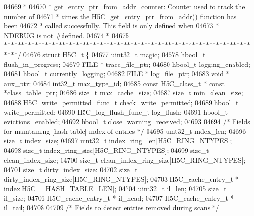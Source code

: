 \begin{DoxyCode}
04669 \textcolor{comment}{ *}
04670 \textcolor{comment}{ * get\_entry\_ptr\_from\_addr\_counter: Counter used to track the number of}
04671 \textcolor{comment}{ *              times the H5C\_get\_entry\_ptr\_from\_addr() function has been}
04672 \textcolor{comment}{ *              called successfully.  This field is only defined when}
04673 \textcolor{comment}{ *              NDEBUG is not #defined.}
04674 \textcolor{comment}{ *}
04675 \textcolor{comment}{ ****************************************************************************/}
04676 \textcolor{keyword}{struct }\hyperlink{struct_h5_c__t}{H5C\_t} \{
04677     uint32\_t            magic;
04678     hbool\_t         flush\_in\_progress;
04679     FILE *          trace\_file\_ptr;
04680     hbool\_t                     logging\_enabled;
04681     hbool\_t                     currently\_logging;
04682     FILE *          log\_file\_ptr;
04683     \textcolor{keywordtype}{void} *          aux\_ptr;
04684     int32\_t         max\_type\_id;
04685     \textcolor{keyword}{const} H5C\_class\_t * \textcolor{keyword}{const}   *class\_table\_ptr;
04686     \textcolor{keywordtype}{size\_t}                      max\_cache\_size;
04687     \textcolor{keywordtype}{size\_t}                      min\_clean\_size;
04688     H5C\_write\_permitted\_func\_t  check\_write\_permitted;
04689     hbool\_t         write\_permitted;
04690     H5C\_log\_flush\_func\_t    log\_flush;
04691     hbool\_t         evictions\_enabled;
04692     hbool\_t         close\_warning\_received;
04693 
04694     \textcolor{comment}{/* Fields for maintaining [hash table] index of entries */}
04695     uint32\_t                    index\_len;
04696     \textcolor{keywordtype}{size\_t}                      index\_size;
04697     uint32\_t            index\_ring\_len[H5C\_RING\_NTYPES];
04698     \textcolor{keywordtype}{size\_t}          index\_ring\_size[H5C\_RING\_NTYPES];
04699     \textcolor{keywordtype}{size\_t}          clean\_index\_size;
04700     \textcolor{keywordtype}{size\_t}          clean\_index\_ring\_size[H5C\_RING\_NTYPES];
04701     \textcolor{keywordtype}{size\_t}          dirty\_index\_size;
04702     \textcolor{keywordtype}{size\_t}          dirty\_index\_ring\_size[H5C\_RING\_NTYPES];
04703     H5C\_cache\_entry\_t *         index[H5C\_\_HASH\_TABLE\_LEN];
04704     uint32\_t                    il\_len;
04705     \textcolor{keywordtype}{size\_t}                      il\_size;
04706     H5C\_cache\_entry\_t *         il\_head;
04707     H5C\_cache\_entry\_t *         il\_tail;
04708 
04709     \textcolor{comment}{/* Fields to detect entries removed during scans */}

\end{DoxyCode}
